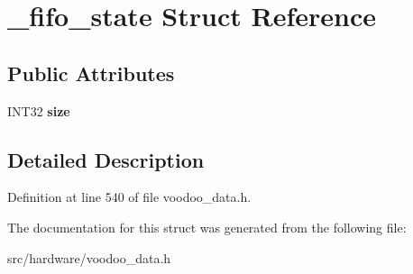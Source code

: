 \hypertarget{struct__fifo__state}{\section{\-\_\-fifo\-\_\-state Struct Reference}
\label{struct__fifo__state}
}
\subsection*{Public Attributes}
\begin{DoxyCompactItemize}
\item 
\hypertarget{struct__fifo__state_a11a3e7e8c12d18bed4dc999576aa2164}{I\-N\-T32 {\bfseries size}}\label{struct__fifo__state_a11a3e7e8c12d18bed4dc999576aa2164}

\end{DoxyCompactItemize}


\subsection{Detailed Description}


Definition at line 540 of file voodoo\-\_\-data.\-h.



The documentation for this struct was generated from the following file\-:\begin{DoxyCompactItemize}
\item 
src/hardware/voodoo\-\_\-data.\-h\end{DoxyCompactItemize}

